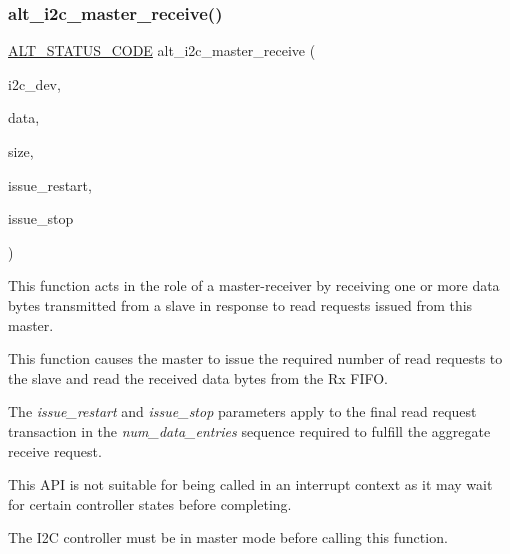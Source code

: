 \subsubsection{\texorpdfstring{alt\_i2c\_master\_receive()}{alt\_i2c\_master\_receive()}}
{\footnotesize\ttfamily \mbox{\hyperlink{hwlib_8h_abdb0d369f069723ca55d6c94bcaaaa12}{A\+L\+T\+\_\+\+S\+T\+A\+T\+U\+S\+\_\+\+C\+O\+DE}} alt\+\_\+i2c\+\_\+master\+\_\+receive (\begin{DoxyParamCaption}\item[{\mbox{\hyperlink{structALT__I2C__DEV__s}{A\+L\+T\+\_\+\+I2\+C\+\_\+\+D\+E\+V\+\_\+t}} $\ast$}]{i2c\+\_\+dev,  }\item[{void $\ast$}]{data,  }\item[{const size\+\_\+t}]{size,  }\item[{const bool}]{issue\+\_\+restart,  }\item[{const bool}]{issue\+\_\+stop }\end{DoxyParamCaption})}

This function acts in the role of a master-\/receiver by receiving one or more data bytes transmitted from a slave in response to read requests issued from this master.

This function causes the master to issue the required number of read requests to the slave and read the received data bytes from the Rx F\+I\+FO.

The {\itshape issue\+\_\+restart} and {\itshape issue\+\_\+stop} parameters apply to the final read request transaction in the {\itshape num\+\_\+data\+\_\+entries} sequence required to fulfill the aggregate receive request.

This A\+PI is not suitable for being called in an interrupt context as it may wait for certain controller states before completing.

The I2C controller must be in master mode before calling this function.


